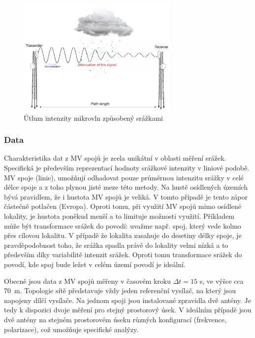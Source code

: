 \documentclass[a4paper,12pt,oneside]{report}
\begin{document}
\newpage %
\begin{figure}[h!]
    \centering
    \includegraphics[width=0.7\textwidth]{./img/srazky/microwave_link.png}
    \caption[Rušení radaru]{\centering Útlum intenzity mikrovln způsobený srážkami}
 \end{figure}   
  

\subsubsection{Data}
Charakteristika dat z MV spojů je zcela unikátní v oblasti měření
srážek. Specifická je především reprezentací hodnoty srážkové
intenzity v liniové podobě. MV spoje (linie), umožňují odhadovat pouze
průměrnou intenzitu srážky v celé délce spoje a z toho plynou jisté
meze této metody. Na hustě osídlených územích bývá pravidlem, že i
hustota MV spojů je veliká. V tomto případě je tento zápor částečně
potlačen (Evropa). Oproti tomu, při využití MV spojů mimo osídlené
lokality, je hustota poněkud menší a to limituje možnosti
využití. Příkladem může být transformace srážek do povodí: uvažme
např.  spoj, který vede kolmo přes cílovou lokalitu. V případě že
lokalita zasahuje do desetiny délky spoje, je pravděpodobnost toho, že
srážka spadla právě do lokality velmi nízká a to především díky
variabilitě intenzit srážek. Oproti tomu transformace srážek do
povodí, kde spoj bude ležet v celém území povodí je ideální.

Obecně jsou data z MV spojů měřeny v časovém kroku $\Delta t=15$ s,
ve výšce cca 70~m. Topologie sítě představuje vždy jeden
referenční vysílač, na který jsou napojeny dílčí vysílače. Na jednom
spoji jsou instalované zpravidla dvě antény. Je tedy k dispozici
dvoje měření pro stejný prostorový úsek. V ideálním případě jsou dvě
antény na stejném prostorovém úseku různých konfigurací (frekvence,
polarizace), což umožňuje specifické analýzy.
\end{document}
